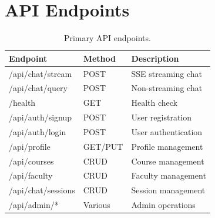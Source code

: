 \documentclass[conference,compsoc]{IEEEtran}
\begin{document}
\section{API Endpoints}

\begin{table}[htbp]
\centering
\caption{Primary API endpoints.}
\label{tab:api_endpoints}
\small
\begin{tabularx}{\columnwidth}{L{2.6cm}L{1.2cm}X}
\toprule
\textbf{Endpoint} & \textbf{Method} & \textbf{Description} \\
\midrule
/api/chat/stream & POST & SSE streaming chat \\
/api/chat/query & POST & Non-streaming chat \\
/health & GET & Health check \\
/api/auth/signup & POST & User registration \\
/api/auth/login & POST & User authentication \\
/api/profile & GET/PUT & Profile management \\
/api/courses & CRUD & Course management \\
/api/faculty & CRUD & Faculty management \\
/api/chat/sessions & CRUD & Session management \\
/api/admin/* & Various & Admin operations \\
\bottomrule
\end{tabularx}
\end{table}
\end{document}
